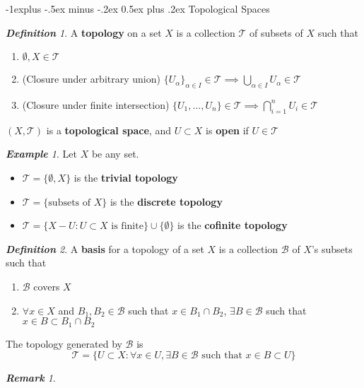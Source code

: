 \documentclass[frenchspacing,9pt,landscape,a4paper]{article}
\makeatletter
\renewcommand{\subsection}{\@startsection{subsection}{2}{0mm}%
                                {-1explus -.5ex minus -.2ex}%
                                {0.5ex plus .2ex}%
                                {\normalfont\normalsize\bfseries}}
\theoremstyle{remark}
\newtheorem*{defn}{\textbf{Definition}}
\newtheorem*{rem}{\textbf{Remark}}
\newtheorem*{eg}{\textbf{Example}}
\makeatother
\begin{document}
\begin{multicols}{4}
\subsection{Topological Spaces}
\begin{defn}
    A \textbf{topology} on a set $X$ is a collection  $\mathcal{T}$ of subsets of  $X$ such that
     \begin{enumerate}
         \item $\emptyset,X\in\mathcal{T}$
         \item  (Closure under arbitrary union) $\{U_\alpha\}_{\alpha\in I}\in\mathcal{T}\implies\bigcup_{\alpha\in
             I}U_\alpha\in\mathcal{T}$
         \item (Closure under finite intersection)  $\{U_1,\dots,U_n\}\in\mathcal{T}\implies\bigcap_{i=1}^n
             U_i\in\mathcal{T}$
     \end{enumerate} $(X,\mathcal{T})$ is a \textbf{topological space}, and  $U\subset X$ is \textbf{open}
     if  $U\in\mathcal{T}$
\end{defn}
\begin{eg}
Let $X$ be any set.
\begin{itemize}
    \item $\mathcal{T}=\{\emptyset,X\}$ is the \textbf{trivial topology}
    \item  $\mathcal{T}=\{\text{subsets of }X\}$ is the \textbf{discrete topology}
    \item $\mathcal{T}=\{X-U:U\subset X\text{ is finite}\}\cup\{\emptyset\}$ is the \textbf{cofinite
        topology}
\end{itemize}    
\end{eg}
\begin{defn}
    A \textbf{basis} for a topology of a set $X$ is a collection  $\mathcal{B}$ of  $X$'s subsets such that
     \begin{enumerate}
         \item $\mathcal{B}$ covers  $X$
         \item  $\forall x\in X$ and  $B_1,B_2\in\mathcal{B}$ such that $x\in B_1\cap B_2$, $\exists
             B\in\mathcal{B}$ such that  $x\in B\subset B_1\cap B_2$
     \end{enumerate} The topology generated by $\mathcal{B}$ is  
     \[\mathcal{T}=\{U\subset X:\forall x\in U,\exists B\in\mathcal{B}\text{ such that }x\in B\subset U\}\]
\end{defn}
\begin{rem}
\begin{itemize}

\end{itemize}
\end{rem}
\end{multicols}
\end{document}
